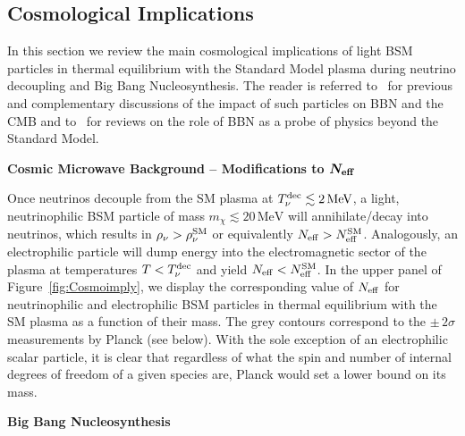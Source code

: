 \subsection{Cosmological Implications}\label{sec:earlyUniverse_method}
In this section we review the main cosmological implications of light BSM particles in thermal equilibrium with the Standard Model plasma during neutrino decoupling and Big Bang Nucleosynthesis. The reader is referred to~\cite{Kolb:1986nf,Serpico:2004nm,Boehm:2013jpa,Nollett:2013pwa,Nollett:2014lwa} for previous and complementary discussions of the impact of such particles on BBN and the CMB and to~\cite{Sarkar:1995dd,Iocco:2008va,Pospelov:2010hj} for reviews on the role of BBN as a probe of physics beyond the Standard Model. 

\vspace{0.5cm}
\noindent\textbf{Cosmic Microwave Background -- Modifications to $\boldsymbol{N_{\rm eff}}$} 

\noindent Once neutrinos decouple from the SM plasma at $T_\nu^{\rm dec} \lesssim 2\,\text{MeV}$, a light, neutrinophilic BSM particle of mass $m_\chi \lesssim 20 \,\text{MeV}$ will annihilate/decay into neutrinos, which results in $\rho_\nu > \rho_\nu^{\rm SM}$ or equivalently $N_{\rm eff} >N_{\rm eff}^{\rm SM}$. Analogously, an electrophilic particle will dump energy into the electromagnetic sector of the plasma at temperatures $T < T_\nu^{\rm dec}$ and yield $N_{\rm eff} < N_{\rm eff}^{\rm SM}$. In the upper panel of Figure~\ref{fig:Cosmoimply}, we display the corresponding value of $N_{\rm eff}$ for neutrinophilic and electrophilic BSM particles in thermal equilibrium with the SM plasma as a function of their mass. The grey contours correspond to the $\pm\,2\sigma$ measurements by Planck (see below). With the sole exception of an electrophilic scalar particle, it is clear that regardless of what the spin and number of internal degrees of freedom of a given species are, Planck would set a lower bound on its mass.

\vspace{0.5cm}
\noindent\textbf{Big Bang Nucleosynthesis}

